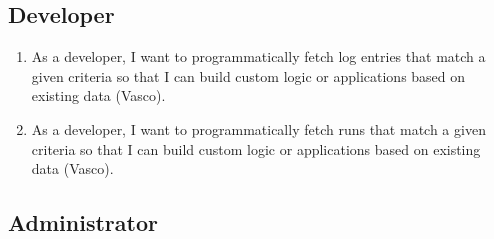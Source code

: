 \subsection{Developer}
\begin{enumerate}
  \item As a developer, I want to programmatically fetch log entries that match a given criteria so that I can build custom logic or applications based on existing data (Vasco). 
  \item As a developer, I want to programmatically fetch runs that match a given criteria so that I can build custom logic or applications based on existing data (Vasco). 
\end{enumerate}

\subsection{Administrator}
